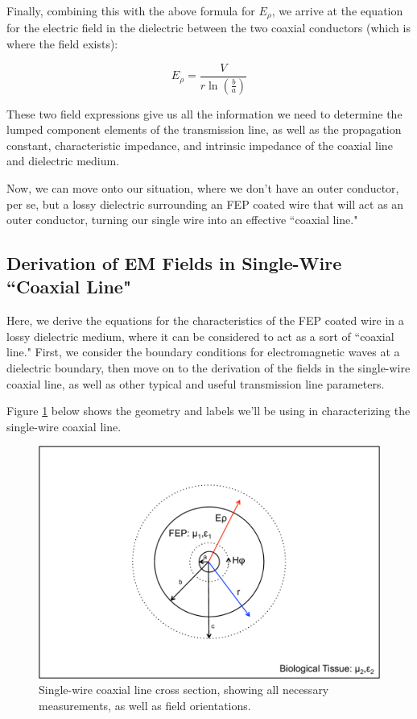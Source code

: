 \documentclass[12pt,onecolumn,titlepage]{article}
\begin{document}
Finally, combining this with the above formula for $E_{\rho}$, we arrive at the equation for the electric field in the dielectric between the two coaxial conductors (which is where the field exists):

\[ E_{\rho} = \frac{V}{r \ln \left( \frac{b}{a} \right)} \]

These two field expressions give us all the information we need to determine the lumped component elements of the transmission line, as well as the propagation constant, characteristic impedance, and intrinsic impedance of the coaxial line and dielectric medium.

Now, we can move onto our situation, where we don't have an outer conductor, per se, but a lossy dielectric surrounding an FEP coated wire that will act as an outer conductor, turning our single wire into an effective ``coaxial line."


\subsection{Derivation of EM Fields in Single-Wire ``Coaxial Line"}
\indent \indent Here, we derive the equations for the characteristics of the FEP coated wire in a lossy dielectric medium, where it can be considered to act as a sort of ``coaxial line." First, we consider the boundary conditions for electromagnetic waves at a dielectric boundary, then move on to the derivation of the fields in the single-wire coaxial line, as well as other typical and useful transmission line parameters.

Figure \ref{fig:single_wire_coax_diagram} below shows the geometry and labels we'll be using in characterizing the single-wire coaxial line.


\begin{figure}[htbp]
	\centering
	\includegraphics[width=\textwidth]{Pictures/4June2013/single_wire_coax_diagram}
	\caption{ Single-wire coaxial line cross section, showing all necessary measurements, as well as field orientations. } 
	\label{fig:single_wire_coax_diagram}
\end{figure}
\end{document}
